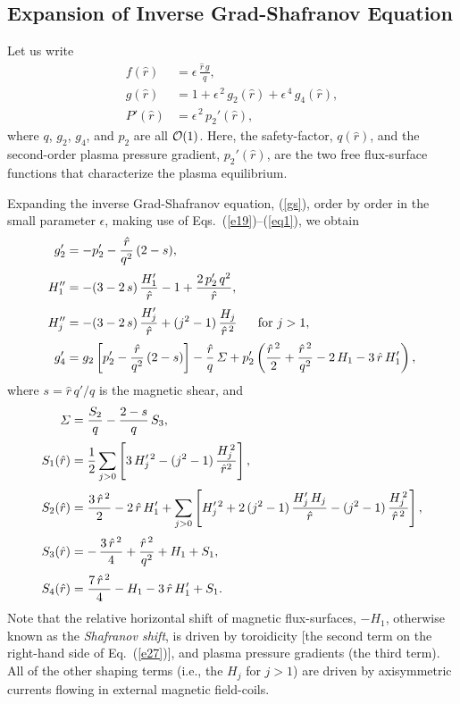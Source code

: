 \documentclass[12pt,prb,aps]{revtex4-1}
\begin{document}
\subsection{Expansion of Inverse Grad-Shafranov Equation}\label{exp}
Let us write\,\cite{tj,tj1}
\begin{align}\label{e26v}
f(\hat{r})&= \epsilon\,\frac{\hat{r}\,g}{q},\\[0.5ex]
g(\hat{r}) &= 1+ \epsilon^{\,2}\,g_2(\hat{r}) + \epsilon^{\,4}\,g_4(\hat{r}),\label{e27v}\\[0.5ex]
P'(\hat{r}) &= \epsilon^{\,2}\,p_2'(\hat{r}),\label{eq1}
\end{align}
where $q$,  $g_2$, $g_4$, and $p_2$ are all ${\cal O}(1)$. Here, the safety-factor, $q(\hat{r})$, and the second-order plasma
pressure gradient, $p_2'(\hat{r})$, are the two free flux-surface functions that characterize the plasma equilibrium.

Expanding the inverse Grad-Shafranov equation, (\ref{gs}), order by order in the
small parameter $\epsilon$, making use of Eqs.~(\ref{e19})--(\ref{eq1}), we obtain\,\cite{am1,tj,tj1}
\begin{align}
g_2'&=- p_2' - \frac{\hat{r}}{q^2}\,(2-s),\label{e26}\\[0.5ex]
H_1''&= -(3-2\,s)\,\frac{H_1' }{\hat{r}}
-1+\frac{2\,p_2'\,q^2}{\hat{r}},\label{e27}\\[0.5ex]
H_j''&= -(3-2\,s)\,\frac{H_j'}{\hat{r}}+(j^2-1)\,\frac{H_j}{\hat{r}^{\,2}}~~~~~\mbox{for $j>1$},\label{e33x}\\[0.5ex]
g_4'&= g_2\left[p_2' - \frac{\hat{r}}{q^2}\,(2-s)\right] - \frac{\hat{r}}{q}\,{\mit\Sigma}
+p_2'\left(\frac{\hat{r}^{\,2}}{2}+\frac{\hat{r}^{\,2}}{q^2}-2\,H_1-3\,\hat{r}\,H_1'\right),\label{e31}
\end{align}
where $s=\hat{r}\,q'/q$ is the magnetic shear, and  
\begin{align}{\mit\Sigma} &=\frac{S_2}{q}- \frac{2-s}{q}\,S_3,\\[0.5ex]
S_1(\hat{r})&=\frac{1}{2}\sum_{j>0} \left[3\,H_j'^{\,2} -(j^2-1)\,\frac{H_j^{\,2}}{\hat{r}^2}\right],\label{e109}
\\[0.5ex]
S_2(\hat{r})&=\frac{3\,\hat{r}^{\,2}}{2} -2\,\hat{r}\,H_1'+\sum_{j>0}\left[H_j'^{\,2}+2\,(j^2-1)\,\frac{H_j'\,H_j}{\hat{r}}-(j^2-1)\,\frac{H_j^{\,2}}{\hat{r}^{\,2}}\right],\\[0.5ex]
S_3(\hat{r})&=-\,\frac{3\,\hat{r}^{\,2}}{4}+\frac{\hat{r}^{\,2}}{q^2} +H_1+S_1,\\[0.5ex]
S_4(\hat{r}) &= \frac{7\,\hat{r}^{\,2}}{4}-H_1 -3\,\hat{r}\,H_1' + S_1.
\end{align}
Note that the relative horizontal shift of magnetic flux-surfaces, $-H_1$, otherwise known as the {\em Shafranov shift}, is driven by toroidicity [the second term on
the right-hand side of Eq.~(\ref{e27})], and plasma pressure gradients (the third term). All of the other shaping terms (i.e., the $H_j$ for $j>1$) are driven by axisymmetric currents flowing in external  magnetic field-coils.
\end{document}
